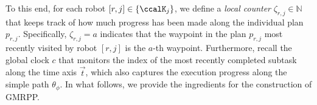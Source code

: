 \documentclass[Afour,sageh,times]{sagej}
\newcommand{\auto}[1]{\ccalA_{\textup{#1}}}
\newcommand{\autop}{\ccalA_{\phi}}
\newcommand{\domanda}[1]{\subsubsection*{#1}}
\begin{document}
{ To this end, for each robot $[r,j] \in \{\ccalK_j\}$, we define a {\it local counter} $\zeta_{r,j} \in \mathbb{N}$  that  keeps track of how much progress has been made along the individual plan $p_{r,j}$. Specifically, $\zeta_{r,j} = a$ indicates that the waypoint in the plan $p_{r,j}$ most recently visited by  robot $[r,j]$ is the $a$-th waypoint. Furthermore, recall the  global clock $c$ that monitors the index of the most recently completed subtask  along the time axis $\vec{t}$, which also captures the execution progress along the simple path  $\theta_{\phi}$. In what follows, we provide the ingredients for the construction of GMRPP.



}
\end{document}
